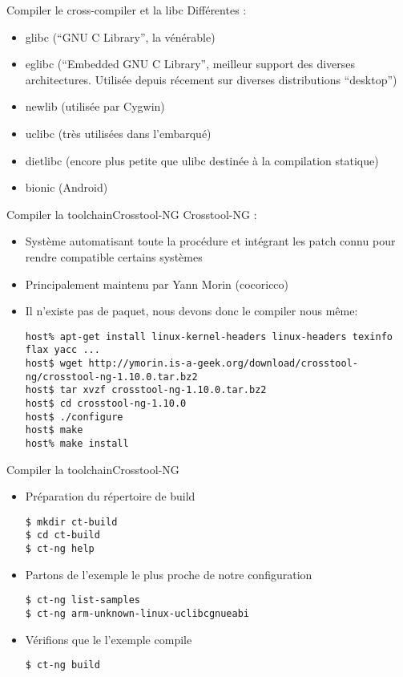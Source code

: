 \begin{frame}[fragile=singleslide]{Compiler le cross-compiler et la libc}
  Différentes :
  \begin{itemize}
  \item glibc (``GNU C Library'', la vénérable)
  \item  eglibc  (``Embedded GNU  C  Library'',  meilleur support  des
    diverses  architectures.  Utilisée  depuis récement  sur  diverses
    distributions ``desktop'')
  \item newlib (utilisée par Cygwin) 
  \item uclibc (très utilisées dans l'embarqué)
  \item  dietlibc  (encore  plus   petite  que  ulibc  destinée  à  la
    compilation statique)
  \item bionic (Android)
  \end{itemize}
\end{frame}

\begin{frame}[fragile=singleslide]{Compiler la toolchain}{Crosstool-NG}
  Crosstool-NG :
  \begin{itemize}
  \item Système automatisant toute la procédure et intégrant les patch
    connu pour rendre compatible certains systèmes
  \item Principalement maintenu par Yann Morin (cocoricco)
  \item Il n'existe pas de paquet, nous devons donc le compiler nous même:
    \begin{lstlisting}
host% apt-get install linux-kernel-headers linux-headers texinfo flax yacc ...
host$ wget http://ymorin.is-a-geek.org/download/crosstool-ng/crosstool-ng-1.10.0.tar.bz2
host$ tar xvzf crosstool-ng-1.10.0.tar.bz2
host$ cd crosstool-ng-1.10.0
host$ ./configure
host$ make 
host% make install
    \end{lstlisting}
  \end{itemize}
\end{frame}
   
\begin{frame}[fragile=singleslide]{Compiler la toolchain}{Crosstool-NG}
  \begin{itemize}
  \item Préparation du répertoire de build
    \begin{lstlisting}
$ mkdir ct-build
$ cd ct-build
$ ct-ng help
    \end{lstlisting}
  \item Partons de l'exemple le plus proche de notre configuration
    \begin{lstlisting}
$ ct-ng list-samples
$ ct-ng arm-unknown-linux-uclibcgnueabi
    \end{lstlisting}
  \item Vérifions que le l'exemple compile
    \begin{lstlisting}
$ ct-ng build
    \end{lstlisting}
  \end{itemize}
\end{frame}

